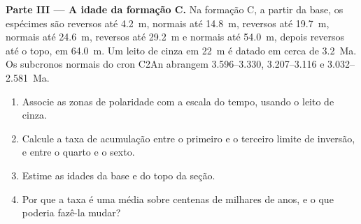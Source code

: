 \begin{problem}
\medskip\noindent\textbf{Parte III --- A idade da formação C.} Na formação C, a partir
da base, os espécimes são reversos até \qty{4.2}{m}, normais até
\qty{14.8}{m}, reversos até \qty{19.7}{m}, normais até \qty{24.6}{m}, reversos até
\qty{29.2}{m} e normais até \qty{54.0}{m}, depois reversos até o topo, em
\qty{64.0}{m}. Um leito de cinza em \qty{22}{m} é datado em cerca de \qty{3.2}{Ma}.
Os subcronos normais do cron C2An abrangem 3.596--3.330, 3.207--3.116 e
3.032--\qty{2.581}{Ma}.
\begin{enumerate}[resume]
  \item Associe as zonas de polaridade com a escala do tempo, usando o leito de cinza.
  \item Calcule a taxa de acumulação entre o primeiro e o terceiro limite de inversão,
        e entre o quarto e o sexto.
  \item Estime as idades da base e do topo da seção.
  \item Por que a taxa é uma média sobre centenas de milhares de anos, e o que
        poderia fazê-la mudar?
\end{enumerate}


\end{problem}
